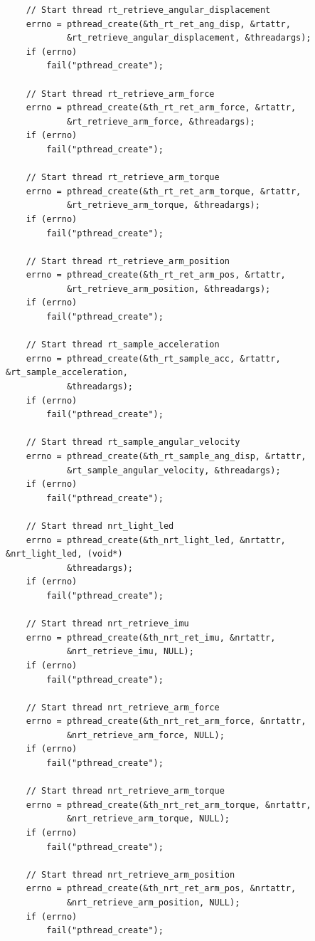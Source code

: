 \documentclass[12pt]{scrreprt}
\begin{document}
\begin{appendices}
\begin{verbatim}
    // Start thread rt_retrieve_angular_displacement
    errno = pthread_create(&th_rt_ret_ang_disp, &rtattr,
            &rt_retrieve_angular_displacement, &threadargs);
    if (errno)
        fail("pthread_create");

    // Start thread rt_retrieve_arm_force
    errno = pthread_create(&th_rt_ret_arm_force, &rtattr,
            &rt_retrieve_arm_force, &threadargs);
    if (errno)
        fail("pthread_create");

    // Start thread rt_retrieve_arm_torque
    errno = pthread_create(&th_rt_ret_arm_torque, &rtattr,
            &rt_retrieve_arm_torque, &threadargs);
    if (errno)
        fail("pthread_create");

    // Start thread rt_retrieve_arm_position
    errno = pthread_create(&th_rt_ret_arm_pos, &rtattr,
            &rt_retrieve_arm_position, &threadargs);
    if (errno)
        fail("pthread_create");

    // Start thread rt_sample_acceleration
    errno = pthread_create(&th_rt_sample_acc, &rtattr, &rt_sample_acceleration,
            &threadargs);
    if (errno)
        fail("pthread_create");

    // Start thread rt_sample_angular_velocity
    errno = pthread_create(&th_rt_sample_ang_disp, &rtattr,
            &rt_sample_angular_velocity, &threadargs);
    if (errno)
        fail("pthread_create");

    // Start thread nrt_light_led
    errno = pthread_create(&th_nrt_light_led, &nrtattr, &nrt_light_led, (void*)
            &threadargs);
    if (errno)
        fail("pthread_create");

    // Start thread nrt_retrieve_imu
    errno = pthread_create(&th_nrt_ret_imu, &nrtattr,
            &nrt_retrieve_imu, NULL);
    if (errno)
        fail("pthread_create");

    // Start thread nrt_retrieve_arm_force
    errno = pthread_create(&th_nrt_ret_arm_force, &nrtattr,
            &nrt_retrieve_arm_force, NULL);
    if (errno)
        fail("pthread_create");

    // Start thread nrt_retrieve_arm_torque
    errno = pthread_create(&th_nrt_ret_arm_torque, &nrtattr,
            &nrt_retrieve_arm_torque, NULL);
    if (errno)
        fail("pthread_create");

    // Start thread nrt_retrieve_arm_position
    errno = pthread_create(&th_nrt_ret_arm_pos, &nrtattr,
            &nrt_retrieve_arm_position, NULL);
    if (errno)
        fail("pthread_create");




\end{verbatim}
\end{appendices}
\end{document}
